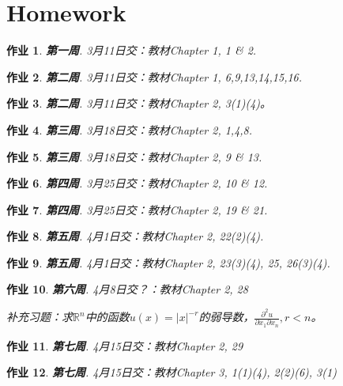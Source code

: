 \documentclass[11pt, a4paper]{article}
\theoremstyle{theorem}
\newtheorem{hw}{作业}
\begin{document}
\newpage

\section{Homework}

\begin{hw} \textbf{第一周}.
3月11日交：教材Chapter 1, 1 \& 2.
\end{hw}

\begin{hw} \textbf{第二周}.
3月11日交：教材Chapter 1, 6,9,13,14,15,16.
\end{hw}

\begin{hw} \textbf{第二周}.
3月11日交：教材Chapter 2, 3(1)(4)。
\end{hw}

\begin{hw} \textbf{第三周}.
3月18日交：教材Chapter 2, 1,4,8.
\end{hw}


\begin{hw} \textbf{第三周}.
3月18日交：教材Chapter 2, 9 \& 13.
\end{hw}

\begin{hw} \textbf{第四周}.
3月25日交：教材Chapter 2, 10 \& 12.
\end{hw}

\begin{hw} \textbf{第四周}.
3月25日交：教材Chapter 2, 19 \& 21.
\end{hw}

\begin{hw} \textbf{第五周}.
4月1日交：教材Chapter 2, 22(2)(4).
\end{hw}

\begin{hw} \textbf{第五周}.
4月1日交：教材Chapter 2, 23(3)(4), 25, 26(3)(4).
\end{hw}

\begin{hw} \textbf{第六周}.
4月8日交？：教材Chapter 2, 28

补充习题：求$\mathbb{R}^n$中的函数$u(x) = |x|^{- r}$的弱导数，$\frac{\partial^2 u}{\partial x_1 \partial x_n}, r < n$。
\end{hw}

\begin{hw} \textbf{第七周}.
4月15日交：教材Chapter 2, 29
\end{hw}

\begin{hw} \textbf{第七周}.
4月15日交：教材Chapter 3, 1(1)(4), 2(2)(6), 3(1)
\end{hw}
\end{document}
